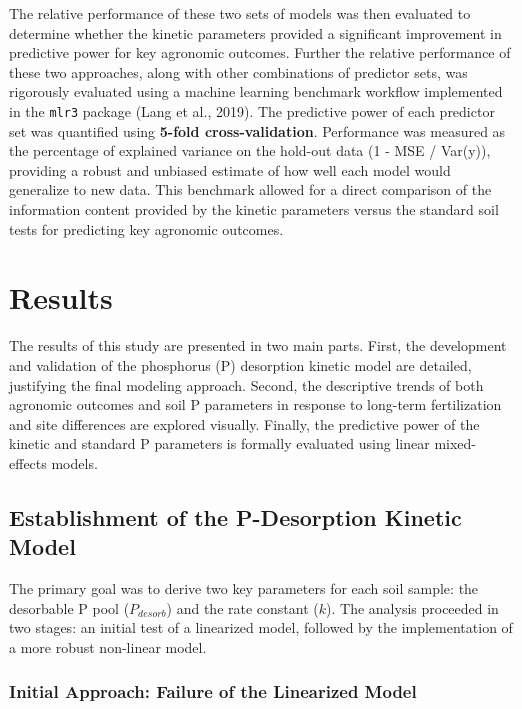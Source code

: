 \documentclass[
  a4paper,
]{article}
\begin{document}
The relative performance of these two sets of models was then evaluated
to determine whether the kinetic parameters provided a significant
improvement in predictive power for key agronomic outcomes. Further the
relative performance of these two approaches, along with other
combinations of predictor sets, was rigorously evaluated using a machine
learning benchmark workflow implemented in the \texttt{mlr3} package
(Lang et al., 2019). The predictive power of each predictor set was
quantified using \textbf{5-fold cross-validation}. Performance was
measured as the percentage of explained variance on the hold-out data (1
- MSE / Var(y)), providing a robust and unbiased estimate of how well
each model would generalize to new data. This benchmark allowed for a
direct comparison of the information content provided by the kinetic
parameters versus the standard soil tests for predicting key agronomic
outcomes.

\section{Results}\label{results}

The results of this study are presented in two main parts. First, the
development and validation of the phosphorus (P) desorption kinetic
model are detailed, justifying the final modeling approach. Second, the
descriptive trends of both agronomic outcomes and soil P parameters in
response to long-term fertilization and site differences are explored
visually. Finally, the predictive power of the kinetic and standard P
parameters is formally evaluated using linear mixed-effects models.

\subsection{Establishment of the P-Desorption Kinetic
Model}\label{establishment-of-the-p-desorption-kinetic-model}

The primary goal was to derive two key parameters for each soil sample:
the desorbable P pool (\(P_{desorb}\)) and the rate constant (\(k\)).
The analysis proceeded in two stages: an initial test of a linearized
model, followed by the implementation of a more robust non-linear model.

\subsubsection{Initial Approach: Failure of the Linearized
Model}\label{initial-approach-failure-of-the-linearized-model}
\end{document}
